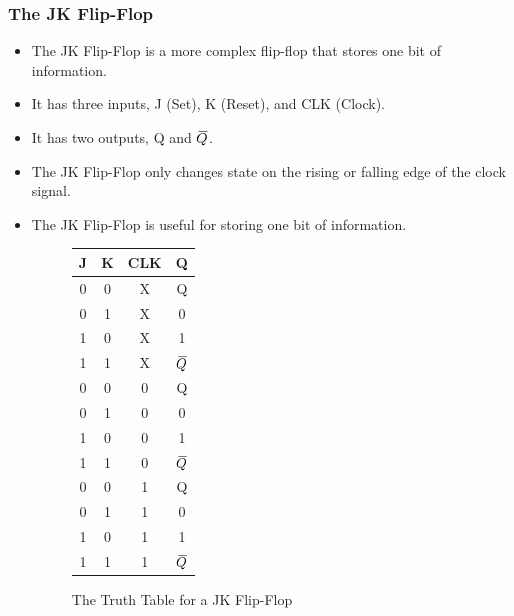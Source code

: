 \documentclass[12pt]{article}
\newcommand{\closure}[2][3]{%
	{}\mkern#1mu\overline{\mkern-#1mu#2}}
\begin{document}
\subsubsection{The JK Flip-Flop}
\begin{itemize}
	\item The JK Flip-Flop is a more complex flip-flop that stores one bit of
	      information.
	\item It has three inputs, J (Set), K (Reset), and CLK (Clock).
	\item It has two outputs, Q and \(\closure{Q}\).
	\item The JK Flip-Flop only changes state on the rising or falling edge
	      of the clock signal.
	\item The JK Flip-Flop is useful for storing one bit of information.
	      \begin{figure}[H]
		      \centering
		      \begin{tabular}{|c|c|c|c|}
			      \hline
			      J & K & CLK & Q               \\
			      \hline
			      0 & 0 & X   & Q               \\
			      0 & 1 & X   & 0               \\
			      1 & 0 & X   & 1               \\
			      1 & 1 & X   & \(\closure{Q}\) \\
			      0 & 0 & 0   & Q               \\
			      0 & 1 & 0   & 0               \\
			      1 & 0 & 0   & 1               \\
			      1 & 1 & 0   & \(\closure{Q}\) \\
			      0 & 0 & 1   & Q               \\
			      0 & 1 & 1   & 0               \\
			      1 & 0 & 1   & 1               \\
			      1 & 1 & 1   & \(\closure{Q}\) \\
			      \hline
		      \end{tabular}
		      \caption{The Truth Table for a JK Flip-Flop}
	      \end{figure}
\end{itemize}
\end{document}
